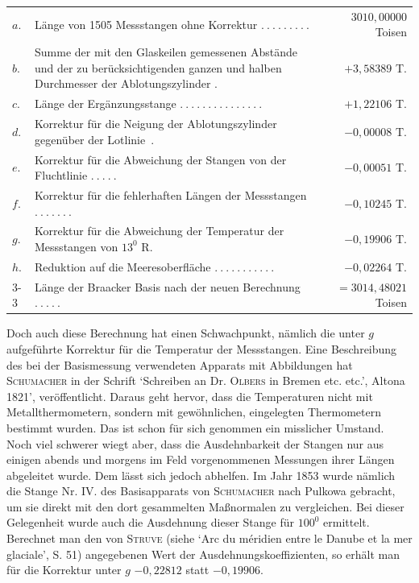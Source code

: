 %
\begin{center}
\begin{tabular}{@{}l p{.54\linewidth} r@{}}
\(a.\)&\raggedright Länge von 1505 Messstangen ohne Korrektur \(.\ .\ .\ .\ .\ .\ .\ .\ .\)&\(3010{,}00000\) Toisen\\
\(b.\)&\raggedright Summe der mit den Glaskeilen gemessenen Abstände und der zu berücksichtigenden ganzen und halben Durchmesser der Ablotungszylinder \(.\)&\(+3{,}58389\) T.\\
\(c.\)&\raggedright Länge der Ergänzungsstange \(.\ .\ .\ .\ .\ .\ .\ .\ .\ .\ .\ .\ .\ .\ .\)&\(+1{,}22106\) T.\\
\(d.\)&\raggedright Korrektur für die Neigung der Ablotungszylinder gegenüber der Lotlinie~\(.\)&\(-0{,}00008\) T.\\
\(e.\)&\raggedright Korrektur für die Abweichung der Stangen von der Fluchtlinie \(.\ .\ .\ .\ .\)&\(-0{,}00051\) T.\\
\(f.\)&\raggedright Korrektur für die fehlerhaften Längen der Messstangen \(.\ .\ .\ .\ .\ .\ .\)&\(-0{,}10245\) T.\\
\(g.\)&\raggedright Korrektur für die Abweichung der Temperatur der Messstangen von \(13^{0}\) R.&\(-0{,}19906\) T.\\
\(h.\)&\raggedright Reduktion auf die Meeresoberfläche \(.\ .\ .\ .\ .\ .\ .\ .\ .\ .\ .\)&\(-0{,}02264\) T.\\\cline{3-3}
&\raggedright Länge der Braacker Basis nach der neuen Berechnung \(.\ .\ .\ .\ .\)&\(=3014{,}48021\) Toisen
\end{tabular}
\end{center}

Doch auch diese Berechnung hat einen Schwachpunkt, nämlich die unter \(g\) aufgeführte Korrektur für die Temperatur der Messstangen. Eine Beschreibung des bei der Basismessung verwendeten Apparats mit Abbildungen hat \textsc{Schumacher} in der Schrift ‘Schreiben an Dr. \textsc{Olbers} in Bremen etc. etc.’, Altona 1821’, veröffentlicht. Daraus geht hervor, dass die Temperaturen nicht mit Metallthermometern, sondern mit gewöhnlichen, eingelegten Thermometern bestimmt wurden. Das ist schon für sich genommen ein misslicher Umstand. Noch viel schwerer wiegt aber, dass die Ausdehnbarkeit der Stangen nur aus einigen abends und morgens im Feld vorgenommenen Messungen ihrer Längen abgeleitet wurde. Dem lässt sich jedoch abhelfen. Im Jahr 1853 wurde nämlich die Stange Nr. IV. des Basisapparats von \textsc{Schumacher} nach Pulkowa gebracht, um sie direkt mit den dort gesammelten Maßnormalen zu vergleichen. Bei dieser Gelegenheit wurde auch die Ausdehnung dieser Stange für \(100^{0}\) ermittelt. Berechnet man den von \textsc{Struve} (siehe ‘Arc du méridien entre le Danube et la mer glaciale’, S. 51) angegebenen Wert der Ausdehnungskoeffizienten, so erhält man für die Korrektur unter \(g\) \(-0{,}22812\) statt \(-0{,}19906\).

